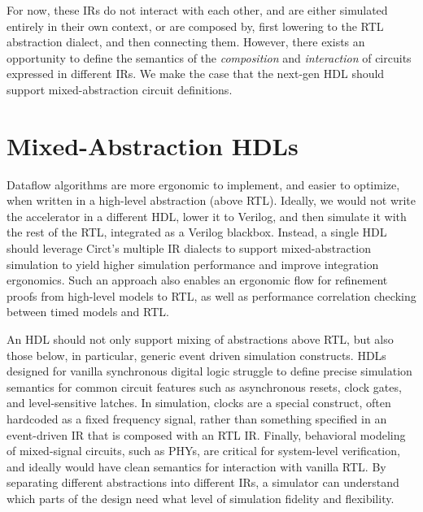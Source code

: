 \documentclass[sigplan,review,nonacm,10pt]{acmart}
\begin{document}
For now, these IRs do not interact with each other, and are either simulated entirely in their own context, or are composed by, first lowering to the RTL abstraction dialect, and then connecting them.
However, there exists an opportunity to define the semantics of the \textit{composition} and \textit{interaction} of circuits expressed in different IRs.
We make the case that the next-gen HDL should support mixed-abstraction circuit definitions.

\section{Mixed-Abstraction HDLs}


Dataflow algorithms are more ergonomic to implement, and easier to optimize, when written in a high-level abstraction (above RTL).
Ideally, we would not write the accelerator in a different HDL, lower it to Verilog, and then simulate it with the rest of the RTL, integrated as a Verilog blackbox.
Instead, a single HDL should leverage Circt's multiple IR dialects to support mixed-abstraction simulation to yield higher simulation performance and improve integration ergonomics\cite{pymtl3, esi, hector}.
Such an approach also enables an ergonomic flow for refinement proofs from high-level models to RTL, as well as performance correlation checking between timed models and RTL.


An HDL should not only support mixing of abstractions above RTL, but also those below, in particular, generic event driven simulation constructs.
HDLs designed for vanilla synchronous digital logic struggle to define precise simulation semantics for common circuit features such as asynchronous resets, clock gates, and level-sensitive latches.
In simulation, clocks are a special construct, often hardcoded as a fixed frequency signal, rather than something specified in an event-driven IR that is composed with an RTL IR.
Finally, behavioral modeling of mixed-signal circuits\cite{llhd}, such as PHYs, are critical for system-level verification, and ideally would have clean semantics for interaction with vanilla RTL.
By separating different abstractions into different IRs, a simulator can understand which parts of the design need what level of simulation fidelity and flexibility.
\end{document}
